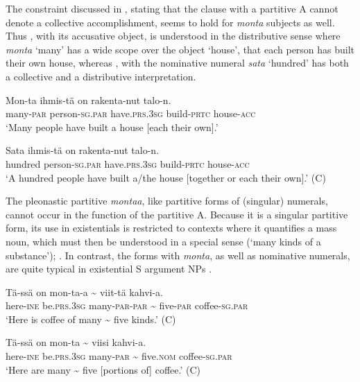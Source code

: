 \documentclass[output=paper]{LSP/langsci}
\begin{document}
The constraint discussed in , stating that the clause with a partitive A cannot denote a collective accomplishment, seems to hold for \textit{monta} subjects as well. Thus , with its accusative object, is understood in the distributive sense where \textit{monta} ‘many’ has a wide scope over the  object ‘house’, \ie  that each person has built their own house, whereas , with the nominative numeral \textit{sata} ‘hundred’ has both a collective and a distributive interpretation. 

\ea\label{15-hu-ex:60}
\gll Mon-ta ihmis-tä on rakenta-nut talo-n.\\
many-\textsc{par} person-\textsc{sg}.\textsc{par} have.\textsc{prs}.\textsc{3sg} build-\textsc{prtc} house-\textsc{acc}\\
\glt ‘Many people have built a house [each their own].’ 
\z

\ea\label{15-hu-ex:61}
\gll Sata ihmis-tä on rakenta-nut talo-n.\\
hundred person-\textsc{sg}.\textsc{par} have.\textsc{prs}.\textsc{3sg} build-\textsc{prtc} house-\textsc{acc}\\
\glt ‘A hundred people have built a/the house [together or each their own].’  (C)
\z

The pleonastic partitive \textit{montaa}, like partitive forms of (singular) numerals, cannot occur in the function of the partitive A. Because it is a singular partitive form, its use in existentials is restricted to contexts where it quantifies a mass noun, which must then be understood in a special sense (‘many kinds of a substance’); \cf {}. In contrast, the forms with \textit{monta}, as well as nominative numerals, are quite typical in existential S argument NPs . 

\ea\label{15-hu-ex:62}
\gll Tä-ssä on mon-ta-a {\textasciitilde} viit-tä kahvi-a.\\
here-\textsc{ine} be.\textsc{prs}.\textsc{3sg} many-\textsc{par}-\textsc{par} {\textasciitilde} five-\textsc{par} coffee-\textsc{sg}.\textsc{par}\\
\glt ‘Here is coffee of many {\textasciitilde} five kinds.’  (C)
\z

\ea%
\label{15-hu-ex:63}

\gll Tä-ssä on mon-ta {\textasciitilde} viisi kahvi-a.\\
here-\textsc{ine} be.\textsc{prs}.\textsc{3sg} many-\textsc{par}  {\textasciitilde} five.\textsc{nom} coffee-\textsc{sg}.\textsc{par}\\
\glt ‘Here are many {\textasciitilde} five [portions of] coffee.’ (C)
\z
\end{document}

